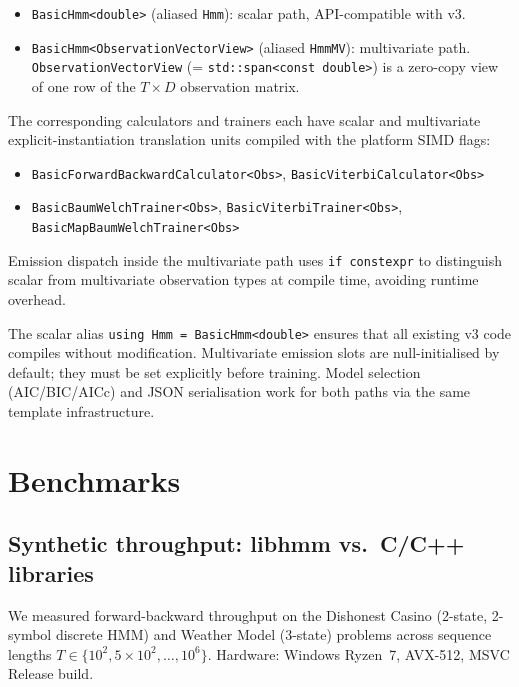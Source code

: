 \documentclass[11pt]{article}
\begin{document}
\begin{itemize}
  \item \texttt{BasicHmm<double>} (aliased \texttt{Hmm}): scalar path,
        API-compatible with v3.
  \item \texttt{BasicHmm<}\texttt{ObservationVectorView>}
        (aliased \texttt{HmmMV}): multivariate path.
        \texttt{ObservationVectorView} (= \texttt{std::span<const double>})
        is a zero-copy view of one row of the $T \times D$ observation matrix.
\end{itemize}

The corresponding calculators and trainers each have scalar and multivariate
explicit-instantiation translation units compiled with the platform SIMD flags:
\begin{itemize}
\item \texttt{BasicForwardBackwardCalculator<Obs>},
      \texttt{BasicViterbiCalculator<Obs>}
\item \texttt{BasicBaumWelchTrainer<Obs>}, \texttt{BasicViterbiTrainer<Obs>},
      \texttt{BasicMapBaumWelchTrainer<Obs>}
\end{itemize}
Emission dispatch inside the multivariate path uses \texttt{if constexpr} to
distinguish scalar from multivariate observation types at compile time, avoiding
runtime overhead.

The scalar alias \texttt{using Hmm = BasicHmm<double>} ensures that all
existing v3 code compiles without modification.
Multivariate emission slots are null-initialised by default; they must be
set explicitly before training.
Model selection (AIC/BIC/AICc) and JSON serialisation work for both paths
via the same template infrastructure.

\FloatBarrier
\section{Benchmarks}
\label{sec:benchmarks}

\subsection{Synthetic throughput: libhmm vs.\ C/C++ libraries}
\label{sec:synthetic_bench}

We measured forward-backward throughput on the Dishonest Casino
(2-state, 2-symbol discrete HMM) and Weather Model (3-state)
problems across sequence lengths $T \in \{10^2, 5\times10^2, \ldots, 10^6\}$.
Hardware: Windows Ryzen~7, AVX-512, MSVC Release build.
\end{document}
